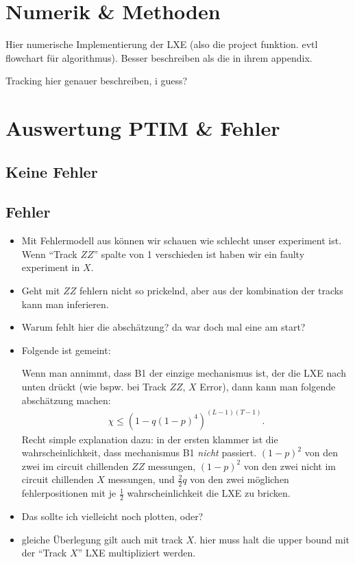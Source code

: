 \section{Numerik \& Methoden}
\label{sec:lxe-numeric}
Hier numerische Implementierung der LXE (also die project funktion. evtl
flowchart für algorithmus). Besser beschreiben als die in ihrem appendix.

Tracking hier genauer beschreiben, i guess?

\section{Auswertung PTIM \& Fehler}
\subsection{Keine Fehler}
\subsection{Fehler}
\begin{itemize}
  \item Mit Fehlermodell aus \cite{tikhanovskayaUniversalityCrossEntropy2023}
    k\"onnen wir schauen wie schlecht unser experiment ist. Wenn
    \enquote{Track $ZZ$} spalte von 1 verschieden ist haben wir ein faulty
    experiment in $X$.
  \item Geht mit $ZZ$ fehlern nicht so prickelnd,%
    aber aus der kombination der tracks kann man inferieren. 
  \item Warum fehlt hier die absch\"atzung? da war doch mal eine am start?
  \item Folgende ist gemeint:

    Wenn man annimmt, dass \textsf{B1} der einzige mechanismus ist, der die LXE
    nach unten dr\"uckt (wie bspw. bei Track $ZZ$, $X$ Error), dann kann man
    folgende absch\"atzung machen:
    \begin{align}
      \chi \leq \left( 1-q\left( 1-p \right)^4  \right)^{(L-1)(T-1)}
    .\end{align}
    Recht simple explanation dazu: in der ersten klammer ist die
    wahrscheinlichkeit, dass mechanismus \textsf{B1} \emph{nicht} passiert.
    $\left( 1-p \right)^2$ von den zwei im circuit chillenden $ZZ$ messungen,
    $\left( 1-p \right)^2$ von den zwei nicht im circuit chillenden $X$
    messungen, und $\frac{2}{2} q$ von den zwei m\"oglichen fehlerpositionen
    mit je $\frac{1}{2}$ wahrscheinlichkeit die LXE zu bricken.

  \item Das sollte ich vielleicht noch plotten, oder?
  \item gleiche \"Uberlegung gilt auch mit track $X$. hier muss halt die upper
    bound mit der \enquote{Track $X$} LXE multipliziert werden.
\end{itemize}

